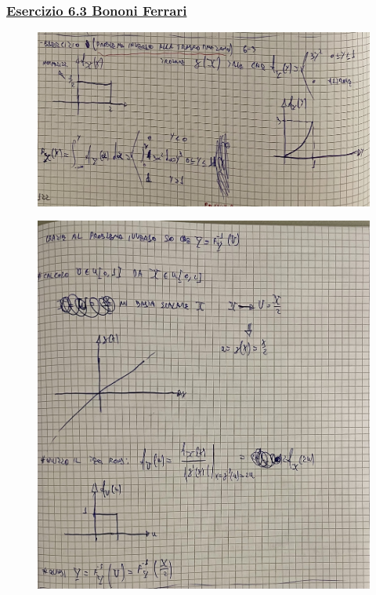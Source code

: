 \documentclass{article}
\begin{document}
\subsubsection{\underline{Esercizio 6.3 Bononi Ferrari}}
\begin{figure}[ht]
\centering
\includegraphics[scale=0.10]{ese/30.jpeg}
\end{figure}
\begin{figure}[ht]
\centering
\includegraphics[scale=0.10]{ese/30a.jpeg}
\end{figure}
\end{document}
